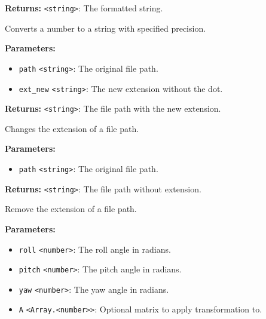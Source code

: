 \documentclass[12pt,a4paper]{article}
\begin{document}
\noindent \textbf{Returns:} \texttt{<string>}: The formatted string.

\noindent Converts a number to a string with specified precision.

\vspace{5mm}
\noindent {}


\noindent \textbf{Parameters:}
\begin{itemize}
  \item \texttt{path} \texttt{<string>}: The original file path.
  \item \texttt{ext\_new} \texttt{<string>}: The new extension without the dot.
\end{itemize}

\noindent \textbf{Returns:} \texttt{<string>}: The file path with the new extension.

\noindent Changes the extension of a file path.

\vspace{5mm}
\noindent {}


\noindent \textbf{Parameters:}
\begin{itemize}
  \item \texttt{path} \texttt{<string>}: The original file path.
\end{itemize}

\noindent \textbf{Returns:} \texttt{<string>}: The file path without extension.

\noindent Remove the extension of a file path.

\vspace{5mm}
\noindent {}


\noindent \textbf{Parameters:}
\begin{itemize}
  \item \texttt{roll} \texttt{<number>}: The roll angle in radians.
  \item \texttt{pitch} \texttt{<number>}: The pitch angle in radians.
  \item \texttt{yaw} \texttt{<number>}: The yaw angle in radians.
  \item \texttt{A} \texttt{<Array.<number>>}: Optional matrix to apply transformation to.
\end{itemize}
\end{document}
